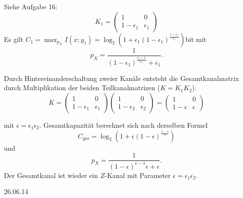\documentclass{article}
\begin{document}
\begin{solution}
    \begin{tasks}
            \item Siehe Aufgabe 16:
        $$
        K_1=
        \begin{pmatrix}
            1 & 0\\
            1-\epsilon_1 & \epsilon_1
        \end{pmatrix}
        $$
        Es gilt $C_1 = \max_{p_X}{I(x;y_1)} = \log_2(1+\epsilon_1{(1-\epsilon_1)}^{\frac{1-\epsilon_1}{\epsilon_1}})$bit mit
            $$
            p_X = \frac 1 {{(1-\epsilon_1)}^{\frac{\epsilon_1-1}{\epsilon_1}}+\epsilon_1}.
            $$
                \item Durch Hintereinanderschaltung zweier Kanäle entsteht die Gesamtkanalmatrix durch Multiplikation der beiden Teilkanalmatrizen ($K=K_1K_2$).
            $$
            K =
            \begin{pmatrix}
                1 & 0 \\
                1-\epsilon_1 & \epsilon_1
            \end{pmatrix}
            \begin{pmatrix}
                1 & 0 \\
                1-\epsilon_2 & \epsilon_2
            \end{pmatrix}
            =
            \begin{pmatrix}
                1 & 0 \\
                1-\epsilon & \epsilon
            \end{pmatrix}
            $$
        \end{tasks}
        mit $\epsilon=\epsilon_1\epsilon_2$. Gesamtkapazität berechnet sich nach derselben Formel
        $$
        C_{\text{ges}} = \log_2(1+\epsilon{(1-\epsilon)}^{\frac{1-\epsilon}{\epsilon}})
        $$
        und
        $$
        p_X = \frac 1 {{(1-\epsilon)}^{\epsilon-1}{\epsilon}+\epsilon}.
        $$
        Der Gesamtkanal ist wieder ein $Z$-Kanal mit Parameter $\epsilon=\epsilon_1\epsilon_2$.
\end{solution}

\hfill{26.06.14}
\begin{exercise}
    
\end{exercise}
\end{document}
